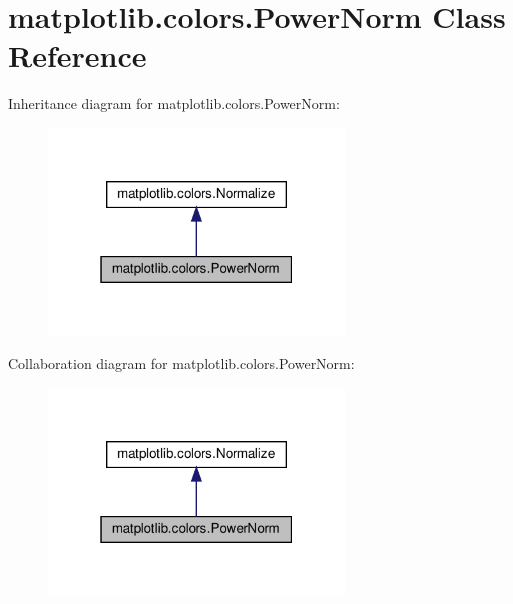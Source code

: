 \hypertarget{classmatplotlib_1_1colors_1_1PowerNorm}{}\section{matplotlib.\+colors.\+Power\+Norm Class Reference}
\label{classmatplotlib_1_1colors_1_1PowerNorm}


Inheritance diagram for matplotlib.\+colors.\+Power\+Norm\+:
\nopagebreak
\begin{figure}[H]
\begin{center}
\leavevmode
\includegraphics[width=223pt]{classmatplotlib_1_1colors_1_1PowerNorm__inherit__graph}
\end{center}
\end{figure}


Collaboration diagram for matplotlib.\+colors.\+Power\+Norm\+:
\nopagebreak
\begin{figure}[H]
\begin{center}
\leavevmode
\includegraphics[width=223pt]{classmatplotlib_1_1colors_1_1PowerNorm__coll__graph}
\end{center}
\end{figure}
